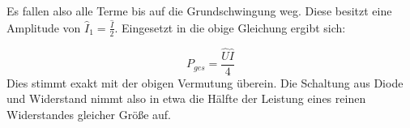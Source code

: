 Es fallen also alle Terme bis auf die Grundschwingung weg. Diese besitzt eine Amplitude von $\hat{I}_{1}=\frac{\hat{I}}{2}$. Eingesetzt in die obige Gleichung ergibt sich:

\begin{equation*}
P_{ges} = \frac{\hat{U}\hat{I}}{4}
\end{equation*}
Dies stimmt exakt mit der obigen Vermutung überein. Die Schaltung aus Diode und Widerstand nimmt also in etwa die Hälfte der Leistung eines reinen Widerstandes gleicher Größe auf.

\newpage